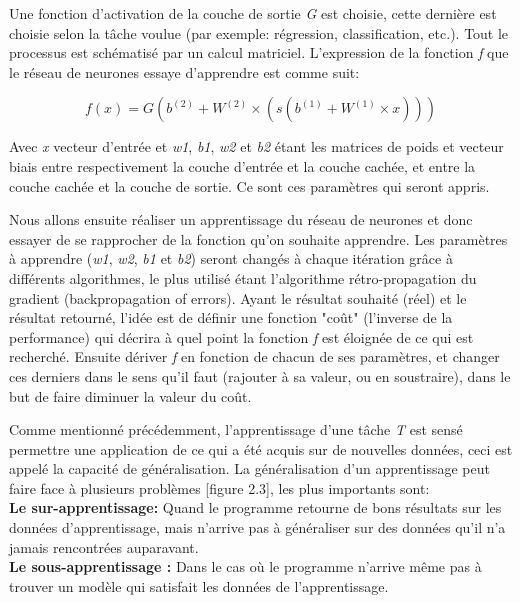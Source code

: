 	Une fonction d'activation de la couche de sortie \textit{G} est choisie, cette dernière est choisie selon la tâche voulue (par exemple: régression, classification, etc.).
Tout le processus est schématisé par un calcul matriciel. L’expression de la fonction \textit{f} que le réseau de neurones essaye d'apprendre est comme suit:

$$f(x) = G( b^{(2)} + W^{(2)}\times( s( b^{(1)} + W^{(1)}\times x)))$$

	Avec \textit{x} vecteur d'entrée et \textit{w1}, \textit{ b1}, \textit{w2} et \textit{b2} étant les matrices de poids et vecteur biais entre respectivement la couche d'entrée et la couche cachée, et entre la couche cachée et la couche de sortie. Ce sont ces paramètres qui seront appris.
	
	Nous allons ensuite réaliser un apprentissage du réseau de neurones et donc essayer de se rapprocher de la fonction qu'on souhaite apprendre. Les paramètres à apprendre (\textit{w1}, \textit{ w2}, \textit{b1} et \textit{b2}) seront changés à chaque itération grâce à différents algorithmes, le plus utilisé étant l'algorithme rétro-propagation du gradient (backpropagation of errors). 
	Ayant le résultat souhaité (réel) et le résultat retourné, l'idée est de définir une fonction "coût" (l'inverse de la performance) qui décrira à quel point la fonction \textit{f} est éloignée de ce qui est recherché. Ensuite dériver \textit{f} en fonction de chacun de ses paramètres, et changer ces derniers dans le sens qu'il faut (rajouter à sa valeur, ou en soustraire), dans le but de faire diminuer la valeur du coût.

	Comme mentionné précédemment, l'apprentissage d'une tâche \textit{T} est sensé permettre une application de ce qui a été acquis sur de nouvelles données, ceci est appelé la capacité de généralisation. La généralisation d'un apprentissage peut faire face à plusieurs problèmes [figure 2.3], les plus importants sont:\\

\textbf{Le sur-apprentissage:} Quand le programme retourne de bons résultats sur les données d'apprentissage, mais n'arrive pas à généraliser sur des données qu'il n'a jamais rencontrées auparavant.\\

\textbf{Le sous-apprentissage :} Dans le cas où le programme n'arrive même pas à trouver un modèle qui satisfait les données de l'apprentissage.\\


